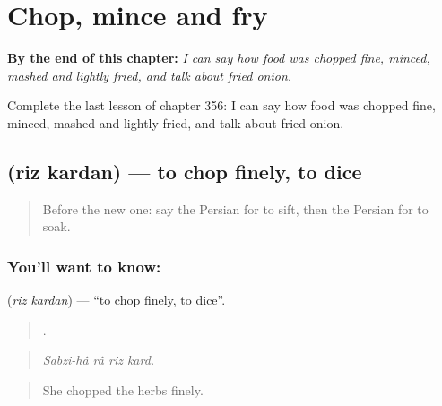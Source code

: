 
\chapter{Chop, mince and fry}
\label{ch:fa-chop-mince-and-fry}

\begin{chapteropening}
\textbf{By the end of this chapter:} \emph{I can say how food was chopped fine, minced, mashed and lightly fried, and talk about fried onion.}

Complete the last lesson of chapter 356: I can say how food was chopped fine, minced, mashed and lightly fried, and talk about fried onion.
\end{chapteropening}

\section[\texorpdfstring{\fa{ریز} \fa{کردن} (riz kardan)}{ریز کردن (riz kardan)}]{  (riz kardan) — to chop finely, to dice}

\label{lesson:FA-C356-riz-kardan}



\begin{quote}
Before the new one: say the Persian for to sift, then the Persian for to soak.
\end{quote}

\subsection*{You'll want to know:  }
\textbf{ } (\emph{riz kardan}) — \textquotedblleft{}to chop finely, to dice\textquotedblright{}.

\begin{quote}
    .
\end{quote}

\begin{quote}
\emph{Sabzi-hâ râ riz kard.}
\end{quote}

\begin{quote}
She chopped the herbs finely.
\end{quote}

